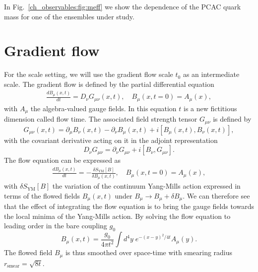 In Fig.~\ref{ch_observables:fig:meff} we show the dependence of the PCAC quark mass for one of the ensembles under study.


\section{Gradient flow}
\label{ch_observables:sec:Flow}

For the scale setting, we will use the gradient flow scale $t_0$ as an intermediate scale. The gradient flow is defined by the partial differential equation~\citep{Luscher:2010we,1006.4518}
\begin{gather}
\label{ch_observables:eq:flow}
\frac{dB_{\mu}(x,t)}{dt}=D_{\nu}G_{\mu\nu}(x,t), \quad B_{\mu}(x,t=0)=A_{\mu}(x),
\end{gather}
with $A_{\mu}$ the algebra-valued gauge fields. In this equation $t$ is a new fictitious dimension called flow time. The associated field strength tensor $G_{\mu\nu}$ is defined by
\begin{equation}
G_{\mu\nu}(x,t)=\partial_{\mu}B_{\nu}(x,t)-\partial_{\nu}B_{\mu}(x,t)+i\left[B_{\mu}(x,t),B_{\nu}(x,t)\right],
\end{equation}
with the covariant derivative acting on it in the adjoint representation
\begin{equation}
D_{\nu}G_{\mu\nu}=\partial_{\nu}G_{\mu\nu}+i\left[B_{\nu},G_{\mu\nu}\right].
\end{equation}
The flow equation can be expressed as~\citep{Fritzsch:2013je}
\begin{gather}
\frac{dB_{\mu}(x,t)}{dt}=-\frac{\delta S_{\textrm{YM}}[B]}{\delta B_{\mu}(x,t)}, \quad B_{\mu}(x,t=0)=A_{\mu}(x),
\end{gather}
with $\delta S_{\textrm{YM}}[B]$ the variation of the continuum Yang-Mills action expressed in terms of the flowed fields $B_{\mu}(x,t)$ under $B_{\mu}\to B_{\mu}+\delta B_{\mu}$. We can therefore see that the effect of integrating the flow equation is to bring the gauge fields towards the local minima of the Yang-Mills action. By solving the flow equation to leading order in the bare coupling $g_0$
\begin{equation}
\label{ch_observables:eq:B}
B_{\mu}(x,t)=\frac{g_0}{4\pi t^2}\int d^4y\;e^{-(x-y)^2/4t}A_{\mu}(y).
\end{equation}
The flowed field $B_{\mu}$ is thus smoothed over space-time with smearing radius $r_{\textrm{smear}}=\sqrt{8t}$.

